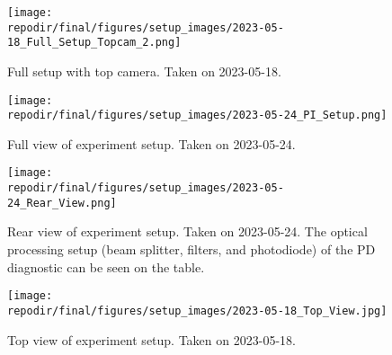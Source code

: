 \begin{figure}[]
\centering
\texttt{[image: \\repodir/final/figures/setup\_images/2023-05-18\_Full\_Setup\_Topcam\_2.png]}
\caption{Full setup with top camera. Taken on 2023-05-18.}
\label{fig:SI_Full_Setup_Topcam}
\end{figure}

\begin{figure}[]
\centering
\texttt{[image: \\repodir/final/figures/setup\_images/2023-05-24\_PI\_Setup.png]}
\caption{Full view of experiment setup. Taken on 2023-05-24.}
\label{fig:SI_Full_Setup_PI}
\end{figure}


\begin{figure}[]
\centering
\texttt{[image: \\repodir/final/figures/setup\_images/2023-05-24\_Rear\_View.png]}
\caption{Rear view of experiment setup. Taken on 2023-05-24. The optical processing setup (beam splitter, filters, and photodiode) of the PD diagnostic can be seen on the table. }
\label{fig:SI_Rear_View}
\end{figure}

\begin{figure}[]
\centering
\texttt{[image: \\repodir/final/figures/setup\_images/2023-05-18\_Top\_View.jpg]}
\caption{Top view of experiment setup. Taken on 2023-05-18.}
\label{fig:SI_Top_View}
\end{figure}


